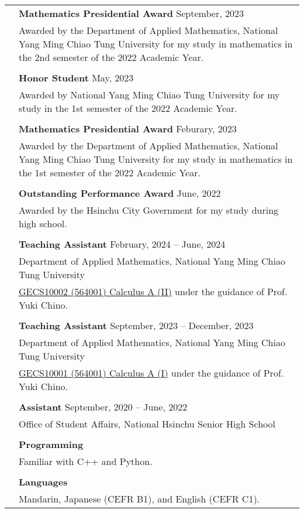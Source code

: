 \documentclass[letterpaper, 11pt]{article}
\begin{document}
\begin{longtable}{p{0.8in}p{5.5in}}
{\color{OliveGreen}{Honors}} 
& \textbf{Mathematics Presidential Award} \hfill September, 2023\\
& Awarded by the Department of Applied Mathematics, National Yang Ming Chiao Tung University for my study in mathematics in the 2nd semester of the 2022 Academic Year.\\
& \\
& \textbf{Honor Student} \hfill May, 2023\\
& Awarded by National Yang Ming Chiao Tung University for my study in the 1st semester of the 2022 Academic Year. \\
& \\
& \textbf{Mathematics Presidential Award} \hfill Feburary, 2023\\
& Awarded by the Department of Applied Mathematics, National Yang Ming Chiao Tung University for my study in mathematics in the 1st semester of the 2022 Academic Year.\\
& \\
& \textbf{Outstanding Performance Award} \hfill June, 2022\\
& Awarded by the Hsinchu City Government for my study during high school.\\
& \\


{\color{OliveGreen}{Work}} 
& \textbf{Teaching Assistant}  \hfill February, 2024 -- June, 2024 \\
{\color{OliveGreen}{Experience}} 
& Department of Applied Mathematics, National Yang Ming Chiao Tung University\\
& \href{https://reurl.cc/RqoMez}{GECS10002 (564001) Calculus A (II)} under the guidance of Prof. Yuki Chino. \\
& \\

& \textbf{Teaching Assistant} \hfill September, 2023 -- December, 2023 \\
& Department of Applied Mathematics, National Yang Ming Chiao Tung University\\
& \href{https://reurl.cc/Djp5jN}{GECS10001 (564001) Calculus A (I)} under the guidance of Prof. Yuki Chino.\\
& \\

& \textbf{Assistant} \hfill September, 2020 -- June, 2022 \\
& Office of Student Affairs, National Hsinchu Senior High School\\
& \\


{\color{OliveGreen}{Skills}} 
& \textbf{Programming}\\
& Familiar with C++ and Python. \\
& \\

& \textbf{Languages} \\
& Mandarin, Japanese (CEFR B1), and English (CEFR C1). \\


\end{longtable}
\end{document}
